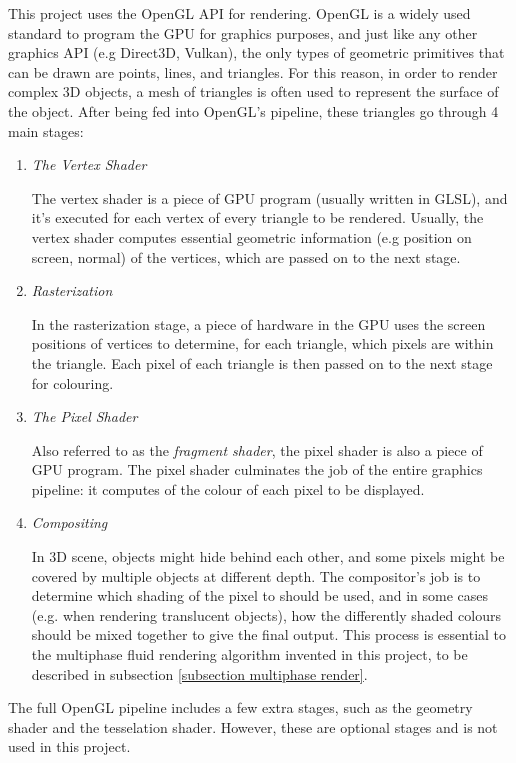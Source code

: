 This project uses the OpenGL API for rendering. OpenGL is a widely used standard to program the GPU for graphics purposes, and just like any other graphics API (e.g Direct3D, Vulkan), the only types of geometric primitives that can be drawn are points, lines, and triangles. For this reason, in order to render complex 3D objects, a mesh of triangles is often used to represent the surface of the object. After being fed into OpenGL's pipeline, these triangles go through 4 main stages:
\begin{enumerate}
    \item 
    \textit{The Vertex Shader}

    The vertex shader is a piece of GPU program (usually written in GLSL), and it's executed for each vertex of every triangle to be rendered. Usually, the vertex shader computes essential geometric information (e.g position on screen, normal) of the vertices, which are passed on to the next stage.
    
    \item 
    \textit{Rasterization}

    In the rasterization stage, a piece of hardware in the GPU uses the screen positions of vertices to determine, for each triangle, which pixels are within the triangle. Each pixel of each triangle is then passed on to the next stage for colouring.
    
    \item
    \textit{The Pixel Shader}

    Also referred to as the \textit{fragment shader}, the pixel shader is also a piece of GPU program. The pixel shader culminates the job of the entire graphics pipeline: it computes of the colour of each pixel to be displayed.

    \item 
    \textit{Compositing}

    In 3D scene, objects might hide behind each other, and some pixels might be covered by multiple objects at different depth. The compositor's job is to determine which shading of the pixel to should be used, and in some cases (e.g. when rendering translucent objects), how the differently shaded colours should be mixed together to give the final output. This process is essential to the multiphase fluid rendering algorithm invented in this project, to be described in subsection \ref{subsection multiphase render}.
    
\end{enumerate}

The full OpenGL pipeline includes a few extra stages, such as the geometry shader and the tesselation shader. However, these are optional stages and is not used in this project. 


